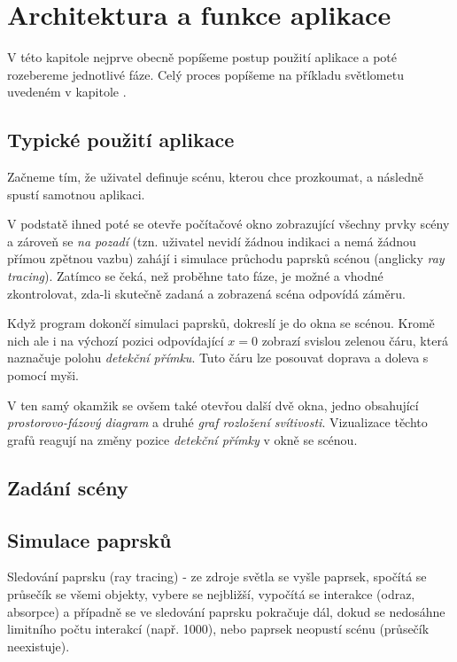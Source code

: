 \section{Architektura a funkce aplikace}

V této kapitole nejprve obecně popíšeme postup použití aplikace a poté rozebereme jednotlivé fáze. Celý proces popíšeme na příkladu světlometu uvedeném v kapitole .

\subsection{Typické použití aplikace}

Začneme tím, že uživatel definuje scénu, kterou chce prozkoumat, a následně spustí samotnou aplikaci.

V podstatě ihned poté se otevře počítačové okno zobrazující všechny prvky scény a zároveň se \emph{na pozadí} (tzn. uživatel nevidí žádnou indikaci a nemá žádnou přímou zpětnou vazbu) zahájí i simulace průchodu paprsků scénou (anglicky \emph{ray tracing}). Zatímco se čeká, než proběhne tato fáze, je možné a vhodné zkontrolovat, zda-li skutečně zadaná a zobrazená scéna odpovídá záměru.

Když program dokončí simulaci paprsků, dokreslí je do okna se scénou. Kromě nich ale i na výchozí pozici odpovídající $ x = 0 $ zobrazí svislou zelenou čáru, která naznačuje polohu \emph{detekční přímku}. Tuto čáru lze posouvat doprava a doleva s pomocí myši.

V ten samý okamžik se ovšem také otevřou další dvě okna, jedno obsahující \emph{prostorovo-fázový diagram} a druhé \emph{graf rozložení svítivosti}. Vizualizace těchto grafů reagují na změny pozice \emph{detekční přímky} v okně se scénou.

\subsection{Zadání scény}


\subsection{Simulace paprsků}


Sledování paprsku (ray tracing) - ze zdroje světla se vyšle paprsek,
spočítá se průsečík se všemi objekty, vybere se nejbližší, vypočítá se
interakce (odraz, absorpce) a případně se ve sledování paprsku pokračuje
dál, dokud se nedosáhne limitního počtu interakcí (např. 1000), nebo
paprsek neopustí scénu (průsečík neexistuje).

